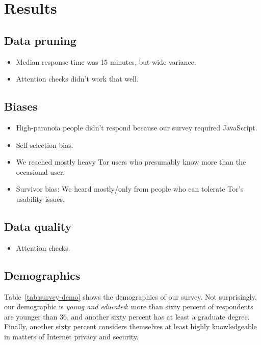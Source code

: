 \section{Results}
\label{sec:results}

\subsection{Data pruning}
\begin{itemize}
    \item Median response time was 15 minutes, but wide variance.
    \item Attention checks didn't work that well.
\end{itemize}

\subsection{Biases}
\begin{itemize}
    \item High-paranoia people didn't respond because our survey required
        JavaScript.
    \item Self-selection bias.
    \item We reached mostly heavy Tor users who presumably know more than the
        occasional user.
    \item Survivor bias: We heard mostly/only from people who can tolerate Tor's
        usability issues.
\end{itemize}

\subsection{Data quality}
\begin{itemize}
    \item Attention checks.
\end{itemize}

\subsection{Demographics}
Table~\ref{tab:survey-demo} shows the demographics of our survey.  Not
surprisingly, our demographic is \emph{young and educated}: more than sixty
percent of respondents are younger than 36, and another sixty percent has at
least a graduate degree.  Finally, another sixty percent considers themselves
at least highly knowledgeable in matters of Internet privacy and security.

